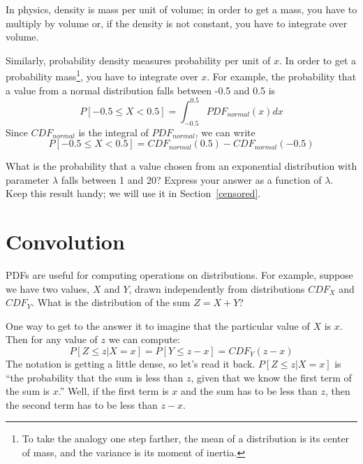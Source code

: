 \documentclass[12pt]{book}
\begin{document}
In physics, density is mass per unit of
volume; in order to get a mass, you have to multiply by volume or,
if the density is not constant, you have to integrate over volume.

Similarly, probability density measures probability per unit of $x$.
In order to get a probability mass\footnote{To take the analogy one
step farther, the mean of a distribution is its center of mass, and
the variance is its moment of inertia.}, you have to integrate over $x$.
For example, the probability that a value from a normal distribution
falls between -0.5 and 0.5 is
%
\[ P[-0.5 \le X < 0.5] = \int_{-0.5}^{0.5} PDF_{normal}(x) dx \]
%
Since $CDF_{normal}$ is the integral of $PDF_{normal}$, we can write
%
\[ P[-0.5 \le X < 0.5] = CDF_{normal}(0.5) - CDF_{normal}(-0.5) \]


\begin{ex}
\label{expo_pdf}

What is the probability that a value chosen from an exponential
distribution with parameter $\lambda$ falls between 1 and 20?  Express
your answer as a function of $\lambda$.  Keep this result handy;
we will use it in Section~\ref{censored}.

\end{ex}


\section{Convolution}

PDFs are useful for computing operations on distributions.  For
example, suppose we have two values, $X$ and $Y$, drawn independently
from distributions $CDF_X$ and $CDF_Y$.  What is the distribution of
the sum $Z = X + Y$?

One way to get to the answer it to imagine that the particular value
of $X$ is $x$.  Then for any value of $z$ we can compute:
%
\[ P[Z \le z | X = x] = P[Y \le z-x] = CDF_Y(z-x) \]
%
The notation is getting a little dense, so let's read it back.  
$P[Z \le z | X = x]$ is ``the probability that the sum is less than
$z$, given that we know the first term of the sum is $x$.''  Well, if
the first term is $x$ and the sum has to be less than $z$, then the
second term has to be less than $z-x$.

\newcommand{\infint}{\int_{-\infty}^{\infty}}
\newcommand{\convolution}{\star}
\end{document}
